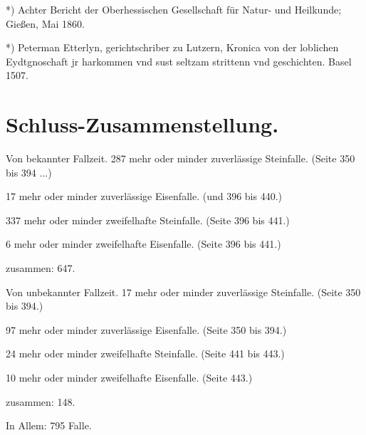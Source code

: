 \documentclass[a4paper, 8pt, oneside, polutonikogreek, german]{article}
\begin{document}
*) Achter Bericht der Oberhessischen Gesellschaft für Natur- und Heilkunde; Gießen, Mai 1860.

*) Peterman Etterlyn, gerichtschriber zu Lutzern, Kronica von der loblichen Eydtgnoschaft jr harkommen vnd sust seltzam strittenn vnd geschichten. Basel 1507.
\clearpage
\section{Schluss-Zusammenstellung.}
Von bekannter Fallzeit.
287 mehr oder minder zuverlässige Steinfalle. (Seite 350 bis 394 ...)

17 mehr oder minder zuverlässige Eisenfalle. (und 396 bis 440.)

337 mehr oder minder zweifelhafte Steinfalle. (Seite 396 bis 441.)

6 mehr oder minder zweifelhafte Eisenfalle. (Seite 396 bis 441.)

zusammen: 647.

Von unbekannter Fallzeit.
17 mehr oder minder zuverlässige Steinfalle. (Seite 350 bis 394.)

97 mehr oder minder zuverlässige Eisenfalle. (Seite 350 bis 394.)

24 mehr oder minder zweifelhafte Steinfalle. (Seite 441 bis 443.)

10 mehr oder minder zweifelhafte Eisenfalle. (Seite 443.)

zusammen: 148.

In Allem: 795 Falle.
\end{document}
